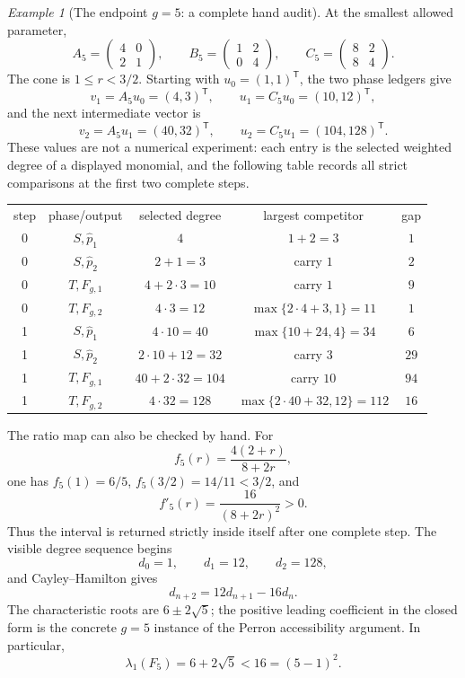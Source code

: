 \documentclass[11pt]{article}
\theoremstyle{remark}
\newtheorem{example}[theorem]{Example}
\numberwithin{equation}{section}
\begin{document}
\begin{example}[The endpoint \(g=5\): a complete hand audit]\label{ex:g5}
At the smallest allowed parameter,
\[
 A_5=\begin{pmatrix}4&0\\2&1\end{pmatrix},\qquad
 B_5=\begin{pmatrix}1&2\\0&4\end{pmatrix},\qquad
 C_5=\begin{pmatrix}8&2\\8&4\end{pmatrix}.
\]
The cone is \(1\leq r<3/2\).  Starting with \(u_0=(1,1)^{\mathsf T}\), the
two phase ledgers give
\[
 v_1=A_5u_0=(4,3)^{\mathsf T},\qquad
 u_1=C_5u_0=(10,12)^{\mathsf T},
\]
and the next intermediate vector is
\[
 v_2=A_5u_1=(40,32)^{\mathsf T},\qquad
 u_2=C_5u_1=(104,128)^{\mathsf T}.
\]
These values are not a numerical experiment: each entry is the selected
weighted degree of a displayed monomial, and the following table records all
strict comparisons at the first two complete steps.
\begin{center}
\small
\begin{tabular}{c|c|c|c|c}
\toprule
step & phase/output & selected degree & largest competitor & gap\\
0 & $S,\widehat p_1$ & $4$ & $1+2=3$ & $1$\\
0 & $S,\widehat p_2$ & $2+1=3$ & carry $1$ & $2$\\
0 & $T,F_{g,1}$ & $4+2\cdot3=10$ & carry $1$ & $9$\\
0 & $T,F_{g,2}$ & $4\cdot3=12$ & $\max\{2\cdot4+3,1\}=11$ & $1$\\
\midrule
1 & $S,\widehat p_1$ & $4\cdot10=40$ & $\max\{10+24,4\}=34$ & $6$\\
1 & $S,\widehat p_2$ & $2\cdot10+12=32$ & carry $3$ & $29$\\
1 & $T,F_{g,1}$ & $40+2\cdot32=104$ & carry $10$ & $94$\\
1 & $T,F_{g,2}$ & $4\cdot32=128$ & $\max\{2\cdot40+32,12\}=112$ & $16$\\
\bottomrule
\end{tabular}
\end{center}
The ratio map can also be checked by hand.  For
\[
 f_5(r)=\frac{4(2+r)}{8+2r},
\]
one has \(f_5(1)=6/5\), \(f_5(3/2)=14/11<3/2\), and
\[
 f'_5(r)=\frac{16}{(8+2r)^2}>0.
\]
Thus the interval is returned strictly inside itself after one complete
step.  The visible degree sequence begins
\[
 d_0=1,\qquad d_1=12,\qquad d_2=128,
\]
and Cayley--Hamilton gives
\[
 d_{n+2}=12d_{n+1}-16d_n.
\]
The characteristic roots are \(6\pm2\sqrt5\); the positive leading
coefficient in the closed form is the concrete \(g=5\) instance of the
Perron accessibility argument.  In particular,
\[
 \lambda_1(F_5)=6+2\sqrt5<16=(5-1)^2.
\]
\end{example}
\end{document}
